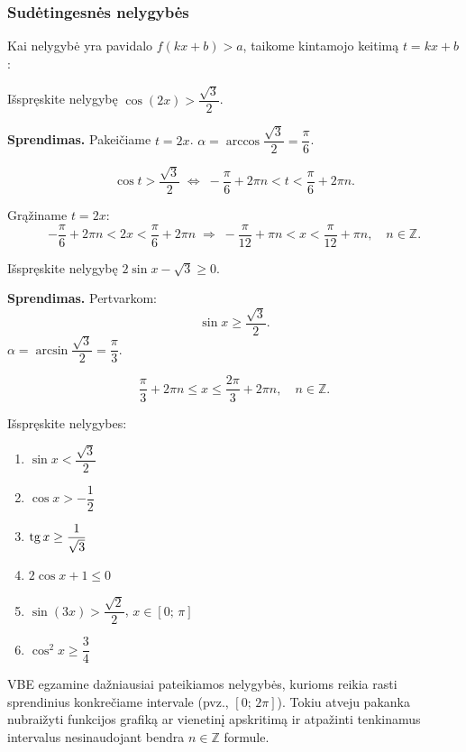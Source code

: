 \subsubsection*{Sudėtingesnės nelygybės}

Kai nelygybė yra pavidalo $f(kx + b) > a$, taikome kintamojo keitimą $t = kx + b$:

\begin{example}
Išspręskite nelygybę $\cos(2x) > \dfrac{\sqrt{3}}{2}$.

\textbf{Sprendimas.} Pakeičiame $t = 2x$. $\alpha = \arccos\dfrac{\sqrt{3}}{2} 
= \dfrac{\pi}{6}$.

\[
    \cos t > \frac{\sqrt{3}}{2} \;\Leftrightarrow\; 
    -\frac{\pi}{6} + 2\pi n < t < \frac{\pi}{6} + 2\pi n.
\]

Grąžiname $t = 2x$:
\[
    -\frac{\pi}{6} + 2\pi n < 2x < \frac{\pi}{6} + 2\pi n
    \;\Rightarrow\; 
    -\frac{\pi}{12} + \pi n < x < \frac{\pi}{12} + \pi n, \quad n \in \mathbb{Z}.
\]
\end{example}

\begin{example}
Išspręskite nelygybę $2\sin x - \sqrt{3} \geq 0$.

\textbf{Sprendimas.} Pertvarkom:
\[
    \sin x \geq \frac{\sqrt{3}}{2}.
\]
$\alpha = \arcsin\dfrac{\sqrt{3}}{2} = \dfrac{\pi}{3}$.

\[
    \frac{\pi}{3} + 2\pi n \leq x \leq \frac{2\pi}{3} + 2\pi n, \quad n \in \mathbb{Z}.
\]
\end{example}

\begin{exercise}
Išspręskite nelygybes:
\begin{enumerate}[label=\alph*)]
    \item $\sin x < \dfrac{\sqrt{3}}{2}$
    \item $\cos x > -\dfrac{1}{2}$
    \item $\operatorname{tg} x \geq \dfrac{1}{\sqrt{3}}$
    \item $2\cos x + 1 \leq 0$
    \item $\sin(3x) > \dfrac{\sqrt{2}}{2}$, $x \in [0;\, \pi]$
    \item $\cos^2 x \geq \dfrac{3}{4}$
\end{enumerate}
\end{exercise}

\begin{remark}
VBE egzamine dažniausiai pateikiamos nelygybės, kurioms reikia rasti sprendinius 
konkrečiame intervale (pvz., $[0;\, 2\pi]$). Tokiu atveju pakanka nubraižyti 
funkcijos grafiką ar vienetinį apskritimą ir atpažinti tenkinamus intervalus 
nesinaudojant bendra $n \in \mathbb{Z}$ formule.
\end{remark}

